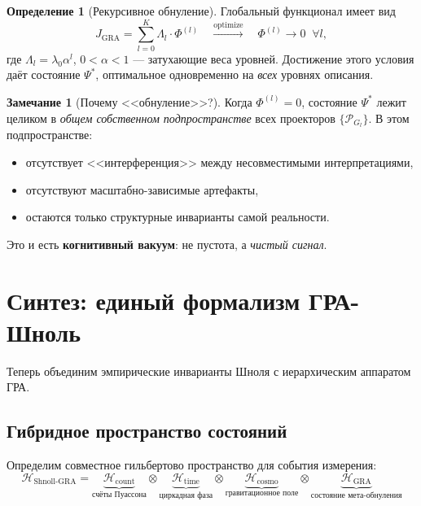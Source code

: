 \documentclass[12pt,a4paper]{article}
\theoremstyle{plain}
\theoremstyle{definition}
\newtheorem{definition}[theorem]{Определение}
\newtheorem{remark}[theorem]{Замечание}
\theoremstyle{remark}
\newcommand{\GRA}{\text{GRA}}
\newcommand{\shnoll}{\text{Shnoll}}
\newcommand{\cH}{\mathcal{H}}
\newcommand{\cP}{\mathcal{P}}
\begin{document}
\begin{definition}[Рекурсивное обнуление]
Глобальный функционал имеет вид
\begin{equation}
    J_{\GRA} = \sum_{l=0}^{K} \Lambda_l \cdot \Phi^{(l)} 
    \quad \xrightarrow{\text{optimize}} \quad 
    \Phi^{(l)} \to 0 \;\; \forall l,
    \label{eq:gra-objective}
\end{equation}
где $\Lambda_l = \lambda_0 \alpha^l$, $0 < \alpha < 1$ --- затухающие веса уровней. Достижение этого условия даёт состояние $\Psi^*$, оптимальное одновременно на \emph{всех} уровнях описания.
\end{definition}

\begin{remark}[Почему <<обнуление>>?]
Когда $\Phi^{(l)} = 0$, состояние $\Psi^*$ лежит целиком в \emph{общем собственном подпространстве} всех проекторов $\{\cP_{G_l}\}$. В этом подпространстве:
\begin{itemize}
    \item отсутствует <<интерференция>> между несовместимыми интерпретациями,
    \item отсутствуют масштабно-зависимые артефакты,
    \item остаются только структурные инварианты самой реальности.
\end{itemize}
Это и есть \textbf{когнитивный вакуум}: не пустота, а \emph{чистый сигнал}.
\end{remark}

\section{Синтез: единый формализм ГРА-Шноль}
\label{sec:synthesis}

Теперь объединим эмпирические инварианты Шноля с иерархическим аппаратом ГРА.

\subsection{Гибридное пространство состояний}

Определим совместное гильбертово пространство для события измерения:
\begin{equation}
\boxed{
\cH_{\shnoll\text{-}\GRA} = 
\underbrace{\cH_{\text{count}}}_{\text{счёты Пуассона}} \otimes 
\underbrace{\cH_{\text{time}}}_{\text{циркадная фаза}} \otimes 
\underbrace{\cH_{\text{cosmo}}}_{\text{гравитационное поле}} \otimes 
\underbrace{\cH_{\GRA}}_{\text{состояние мета-обнуления}}
}
\label{eq:hybrid-space}
\end{equation}
\end{document}

